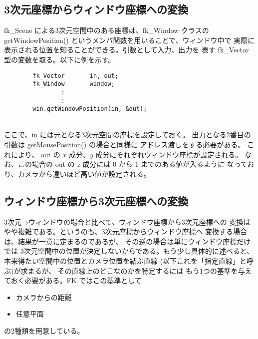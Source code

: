 \subsection{3次元座標からウィンドウ座標への変換}
fk\_Scene による3次元空間中のある座標は、fk\_Window クラスの
getWindowPosition() というメンバ関数を用いることで、ウィンドウ中で
実際に表示される位置を知ることができる。引数として入力、出力を
表す fk\_Vector 型の変数を取る。以下に例を示す。
\\
\begin{breakbox}
\begin{verbatim}
        fk_Vector       in, out;
        fk_Window       window;
                :
                :
        win.getWindowPosition(in, &out);
\end{verbatim}
\end{breakbox}
~ \\
ここで、in には元となる3次元空間の座標を設定しておく。
出力となる2番目の引数は getMousePosition() の場合と同様に
アドレス渡しをする必要がある。
これにより、
out の \(x\) 成分、\(y\) 成分にそれぞれウィンドウ座標が設定される。
なお、この場合の out の \(z\) 成分には 0 から 1 までのある値が入るように
なっており、カメラから遠いほど高い値が設定される。

\subsection{ウィンドウ座標から3次元座標への変換}
3次元→ウィンドウの場合と比べて、ウィンドウ座標から3次元座標への
変換はやや複雑である。というのも、3次元座標からウィンドウ座標へ
変換する場合は、結果が一意に定まるのであるが、
その逆の場合は単にウィンドウ座標だけでは
3次元空間中の位置が決定しないからである。もう少し具体的に述べると、
本来得たい空間中の位置とカメラ位置を結ぶ直線
(以下これを「指定直線」と呼ぶ)が求まるが、
その直線上のどこなのかを特定するには
もう1つの基準を与えておく必要がある。FK ではこの基準として
\begin{itemize}
 \item カメラからの距離
 \item 任意平面
\end{itemize}
の2種類を用意している。

